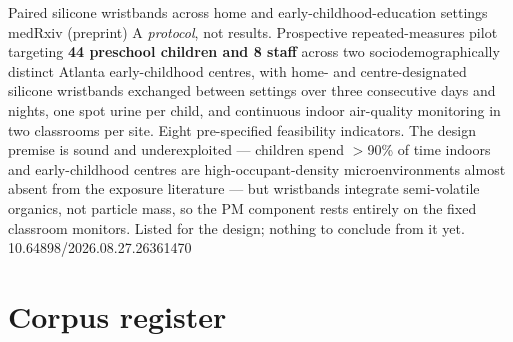 \documentclass[10pt]{article}
\begin{document}
{Paired silicone wristbands across home and early-childhood-education settings}
{medRxiv (preprint)}
{A \emph{protocol}, not results. Prospective repeated-measures pilot targeting
\textbf{44 preschool children and 8 staff} across two sociodemographically distinct Atlanta
early-childhood centres, with home- and centre-designated silicone wristbands exchanged
between settings over three consecutive days and nights, one spot urine per child, and
continuous indoor air-quality monitoring in two classrooms per site. Eight pre-specified
feasibility indicators. The design premise is sound and underexploited --- children spend
$>$90\% of time indoors and early-childhood centres are high-occupant-density
microenvironments almost absent from the exposure literature --- but wristbands integrate
semi-volatile organics, not particle mass, so the PM component rests entirely on the
fixed classroom monitors. Listed for the design; nothing to conclude from it yet.}
{10.64898/2026.08.27.26361470}

\clearpage

\section*{\sffamily\bfseries\color{Deep}Corpus register}
\vspace{-1.5mm}{\color{Amber}\rule{\linewidth}{1.1pt}}\vspace{2.5mm}


\end{document}
